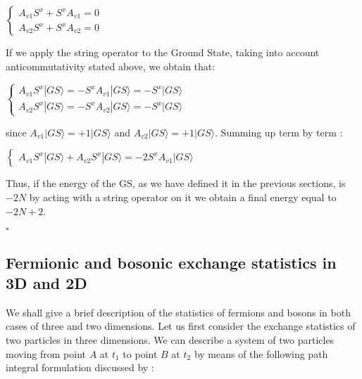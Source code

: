 \documentclass{Configuration_Files/PoliMi3i_thesis}
\begin{document}
\begin{center}
	$\begin{cases} 
		A_{v1} S^x + S^x A_{v1} =0 \\
		A_{v2} S^x + S^x A_{v2} =0
	\end{cases}$ 
\end{center}

If we apply the string operator to the Ground State, taking into account anticommutativity stated above, we obtain that:

\begin{center}
	$\begin{cases}
		A_{v1} S^x |GS\rangle = - S^x A_{v1} |GS\rangle = - S^x |GS\rangle \\
		
		A_{v2} S^x |GS\rangle = - S^x A_{v2} |GS\rangle = - S^x |GS\rangle
	\end{cases}$ 
\end{center}

since $A_{v1}|GS\rangle = +1|GS\rangle$ and $A_{v2}|GS\rangle = +1|GS\rangle$.
Summing up term by term :

\begin{center}
	$\begin{cases}
		A_{v1} S^x |GS\rangle + A_{v2} S^x |GS\rangle = - 2 S^x A_{v1} |GS\rangle
	\end{cases}$ 
\end{center}

Thus, if the energy of the GS, as we have defined it in the previous sections, is $-2N$ by acting with a string operator on  it we obtain a final energy equal to $-2N+2$.

\hfill $\square$ 







\subsection{Fermionic and bosonic exchange statistics in 3D and 2D}
We shall give a brief description of the statistics of fermions and bosons in both cases of three and two dimensions.
Let us first consider the exchange statistics of two particles in three dimensions. We can describe a system of two particles moving from point $A$ at $t_1$ to point $B$ at $t_2$ by means of the following path integral formulation discussed by \cite{Rao16}:
\end{document}
